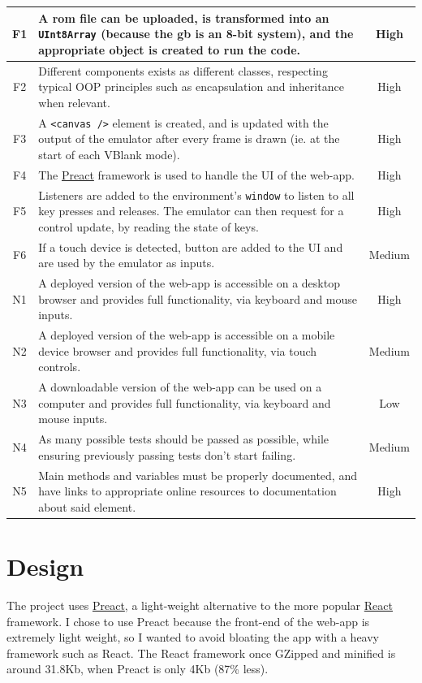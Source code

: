 \documentclass[11pt]{report}
\begin{document}
\begin{xltabular}{\textwidth}{|c|X|c|}
    F1 & A \gls{rom} file can be uploaded, is transformed into an \texttt{UInt8Array} (because the \gls{gb} is an 8-bit system), and the appropriate object is created to run the code. & High \\ \hline
    F2 & Different components exists as different classes, respecting typical OOP principles such as encapsulation and inheritance when relevant. & High \\ \hline
    F3 & A \texttt{<canvas />} element is created, and is updated with the output of the emulator after every frame is drawn (ie. at the start of each VBlank mode). & High \\ \hline
    F4 & The \href{https://preactjs.com/}{Preact} framework is used to handle the UI of the web-app. & High \\ \hline
    F5 & Listeners are added to the environment's \texttt{window} to listen to all key presses and releases. The emulator can then request for a control update, by reading the state of keys. & High \\ \hline
    F6 & If a touch device is detected, button are added to the UI and are used by the emulator as inputs. & Medium \\ \hline

    N1 & A deployed version of the web-app is accessible on a desktop browser and provides full functionality, via keyboard and mouse inputs. & High \\ \hline
    N2 & A deployed version of the web-app is accessible on a mobile device browser and provides full functionality, via touch controls. & Medium \\ \hline
    N3 & A downloadable version of the web-app can be used on a computer and provides full functionality, via keyboard and mouse inputs. & Low \\ \hline
    N4 & As many possible tests should be passed as possible, while ensuring previously passing tests don't start failing. & Medium \\ \hline
    N5 & Main methods and variables must be properly documented, and have links to appropriate online resources to documentation about said element. & High \\ \hline
\end{xltabular}

\chapter{Design}

The project uses \href{https://preactjs.com/}{Preact}, a light-weight alternative to the more popular \href{https://reactjs.org/}{React} framework. I chose to use Preact because the front-end of the web-app is extremely light weight, so I wanted to avoid bloating the app with a heavy framework such as React. The React framework once GZipped and minified is around 31.8Kb, when Preact is only 4Kb (87\% less).
\end{document}
